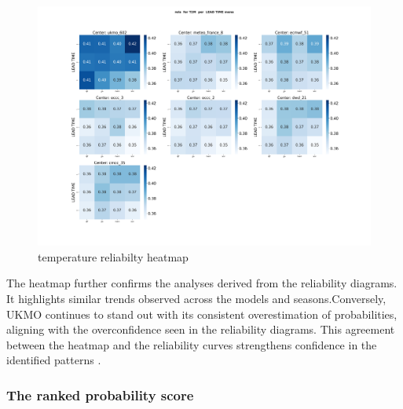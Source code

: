 \begin{figure}[H]
    \centering
    \includegraphics[width=1\linewidth]{plots/prob/rela/rela_T2M_mena.png}
    \caption{temperature reliabilty heatmap}
    \label{CORR_mam_t2m.png}
\end{figure}
The heatmap further confirms the analyses derived from the reliability diagrams. It highlights similar trends observed across the models and seasons.Conversely, UKMO continues to stand out with its consistent overestimation of probabilities, aligning with the overconfidence seen in the reliability diagrams. This agreement between the heatmap and the reliability curves strengthens confidence in the identified patterns .




\subsubsection{The ranked probability score }

